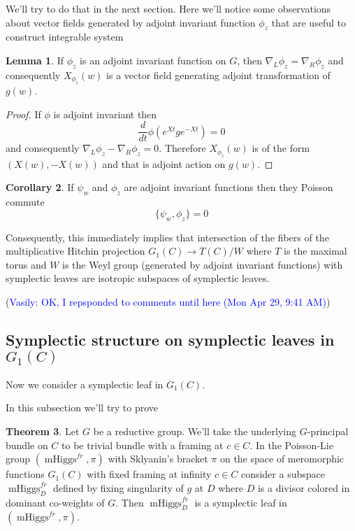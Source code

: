 \documentclass[11pt, oneside, reqno]{amsart}
\theoremstyle{definition} \newtheorem{definition}{Definition}[section]
\newtheorem{lemma}[definition]{Lemma}
\newtheorem{theorem}[definition]{Theorem}
\newtheorem{corollary}[definition]{Corollary}
\theoremstyle{definition} \newtheorem{remark}[definition]{Remark}
\theoremstyle{definition} \newtheorem{remarks}[definition]{Remarks}
\theoremstyle{definition} \newtheorem{question}[definition]{Question}
\theoremstyle{definition} \newtheorem*{note}{Note}
\theoremstyle{definition} \newtheorem{example}[definition]{Example}
\theoremstyle{definition} \newtheorem{examples}[definition]{Examples}
\DeclareMathOperator{\mhiggs}{mHiggs}
\newcommand{\vasily}[1]{(\textcolor{blue}{Vasily: #1})}
\begin{document}
We'll try to do that in the next section. Here we'll notice some observations
about vector fields generated by adjoint invariant function $\phi_z$ that are useful
to construct integrable system 
\begin{lemma}
 If $\phi_z$ is an adjoint invariant function on $G$, then
$\nabla_{L} \phi_z  = \nabla_{R} \phi_z$ and consequently $X_{\phi_z}(w)$ is
a vector field generating adjoint transformation of $g(w)$. 
\end{lemma}
\begin{proof}
  If $\phi$ is adjoint invariant then
  \begin{equation}
    \frac{d}{dt} \phi(e^{Xt} g e^{-Xt}) = 0
  \end{equation}
  and consequently $\nabla_{L} \phi_z - \nabla_{R} \phi_z  = 0$. Therefore $X_{\phi_z}(w)$ is
  of the form $(X(w), -X(w))$ and that is adjoint action on $g(w)$. 
\end{proof}

\begin{corollary}\label{cor:poisson-commuting}
  If $\psi_{w}$ and $\phi_{z}$ are adjoint invariant functions then they Poisson commute 
  \begin{equation}
    \{ \psi_{w}, \phi_{z} \} = 0
  \end{equation}
\end{corollary}

Consequently, this immediately implies that intersection
of the fibers of the multiplicative Hitchin
projection $G_1(C) \to T(C)/W$ where $T$ is the maximal torus and $W$ is the Weyl group (generated
by adjoint invariant functions) with symplectic leaves are isotropic subspaces of symplectic leaves.



\vasily{OK, I repsponded to comments until here (Mon Apr 29, 9:41 AM)}


\subsection{Symplectic structure on symplectic leaves in $G_1(C)$}

Now we consider a symplectic leaf in $G_1(C)$. 

In this subsection we'll try to prove
\begin{theorem}\label{theorem:symplectic_leaf}
  Let $G$ be a reductive group. We'll take the underlying $G$-principal bundle on $C$
  to be trivial bundle with a framing at $c \in C$. 
In the Poisson-Lie group $(\mhiggs^{fr}, \pi)$ with Sklyanin's bracket $\pi$
on the space of meromorphic functions $G_1(C)$ with fixed framing at infinity $c \in C$
consider a subspace  $\mhiggs^{fr}_{D}$
defined 
  by fixing singularity of $g$ at $D$ where $D$ is a divisor colored in dominant co-weights of $G$. Then $\mhiggs^{fr}_{D}$ is a symplectic leaf in $(\mhiggs^{fr}, \pi)$. 
\end{theorem}
\end{document}
